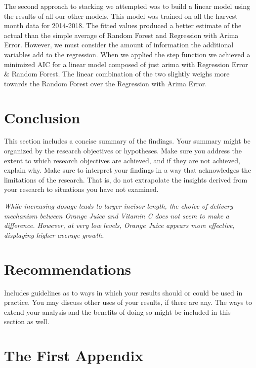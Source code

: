 \documentclass[12pt,oneside]{chicagocapstone}
\begin{document}
The second approach to stacking we attempted was to build a linear model
using the results of all our other models. This model was trained on all
the harvest month data for 2014-2018. The fitted values produced a
better estimate of the actual than the simple average of Random Forest
and Regression with Arima Error. However, we must consider the amount of
information the additional variables add to the regression. When we
applied the step function we achieved a minimized AIC for a linear model
composed of just arima with Regression Error \& Random Forest. The
linear combination of the two slightly weighs more towards the Random
Forest over the Regression with Arima Error.

\chapter*{Conclusion}\label{conclusion}

This section includes a concise summary of the findings. Your summary
might be organized by the research objectives or hypotheses. Make sure
you address the extent to which research objectives are achieved, and if
they are not achieved, explain why. Make sure to interpret your findings
in a way that acknowledges the limitations of the research. That is, do
not extrapolate the insights derived from your research to situations
you have not examined.

\emph{While increasing dosage leads to larger incisor length, the choice
of delivery mechanism between Orange Juice and Vitamin C does not seem
to make a difference. However, at very low levels, Orange Juice appears
more effective, displaying higher average growth.}

\chapter*{Recommendations}\label{recommendations}

Includes guidelines as to ways in which your results should or could be
used in practice. You may discuss other uses of your results, if there
are any. The ways to extend your analysis and the benefits of doing so
might be included in this section as well.

\appendix

\chapter{The First Appendix}\label{the-first-appendix}
\end{document}
